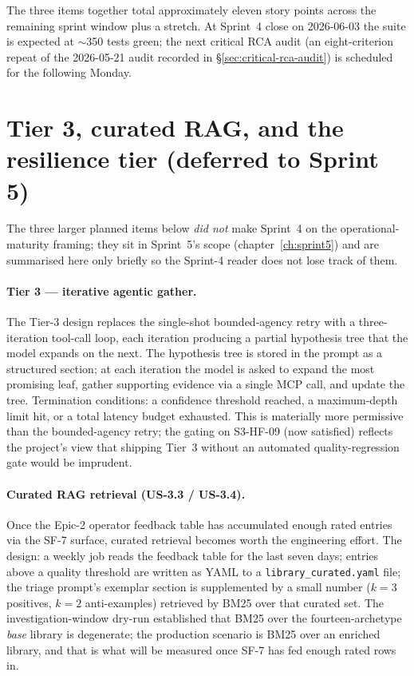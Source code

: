 \documentclass[11pt,a4paper,oneside]{report}
\begin{document}
The three items together total approximately eleven story
points across the remaining sprint window plus a stretch.  At
Sprint~4 close on 2026-06-03 the suite is expected at
$\sim$350 tests green; the next critical RCA audit (an
eight-criterion repeat of the 2026-05-21 audit recorded in
\S\ref{sec:critical-rca-audit}) is scheduled for the
following Monday.

\section{Tier 3, curated RAG, and the resilience tier (deferred to Sprint 5)}

The three larger planned items below \emph{did not} make Sprint~4
on the operational-maturity framing; they sit in Sprint~5's
scope (chapter~\ref{ch:sprint5}) and are summarised here only
briefly so the Sprint-4 reader does not lose track of them.

\paragraph{Tier 3 --- iterative agentic gather.}
The Tier-3 design replaces the single-shot bounded-agency retry
with a three-iteration tool-call loop, each iteration producing a
partial hypothesis tree that the model expands on the next.  The
hypothesis tree is stored in the prompt as a structured section;
at each iteration the model is asked to expand the most promising
leaf, gather supporting evidence via a single MCP call, and update
the tree.  Termination conditions: a confidence threshold reached,
a maximum-depth limit hit, or a total latency budget exhausted.
This is materially more permissive than the bounded-agency retry;
the gating on S3-HF-09 (now satisfied) reflects the project's view
that shipping Tier~3 without an automated quality-regression gate
would be imprudent.

\paragraph{Curated RAG retrieval (US-3.3 / US-3.4).}
Once the Epic-2 operator feedback table has accumulated enough
rated entries via the SF-7 surface, curated retrieval becomes
worth the engineering effort.  The design: a weekly job reads the
feedback table for the last seven days; entries above a quality
threshold are written as YAML to a
\texttt{library\_curated.yaml} file; the triage prompt's exemplar
section is supplemented by a small number ($k=3$ positives,
$k=2$ anti-examples) retrieved by BM25 over that curated set.
The investigation-window dry-run established that BM25 over the
fourteen-archetype \emph{base} library is degenerate; the
production scenario is BM25 over an enriched library, and that is
what will be measured once SF-7 has fed enough rated rows in.
\end{document}
